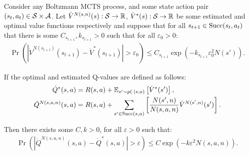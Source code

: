     \begin{lemma} \label{lem:stochastic_step}
        Consider any Boltzmann MCTS process, and some state action pair $(s_t,a_t)\in\mathcal{S}\times\mathcal{A}$. Let $\dot{V}^{N(s,n)}(s):\mathcal{S}\rightarrow \mathbb{R}$, $\dot{V}^*(s):\mathcal{S}\rightarrow \mathbb{R}$ be some estimated and optimal value functions respectively and suppose that for all $s_{t+1}\in{\textnormal{Succ}(s_t,a_t)}$ that there is some $C_{s_{t+1}}, k_{s_{t+1}}>0$ such that for all $\varepsilon_0 >0$:
        \begin{align}
            \Pr\left(\left| \dot{V}^{N(s_{t+1})}(s_{t+1}) - \dot{V}^*(s_{t+1}) \right| > \varepsilon_0 \right) \leq C_{s_{t+1}}\exp(-k_{s_{t+1}}\varepsilon_0^2 N(s')).
        \end{align}
        
        If the optimal and estimated Q-values are defined as follows: 
        \begin{align}
            \dot{Q}^*(s,a)&=R(s,a)+\mathbb{E}_{s'\sim p(\cdot|s,a)}\left[\dot{V}^*(s')\right], \\
            \dot{Q}^{N(s,a,n)}(s,a)&=R(s,a)+\sum_{s'\in{\textnormal{Succ}(s,a)}} \left[
                \frac{N(s',n)}{N(s,a,n)} \dot{V}^{N(s',n)}(s')\right].
        \end{align}
        
        Then there exists some $C,k>0$, for all $\varepsilon>0$ such that:
        \begin{align}
            \Pr\left(\left| \dot{Q}^{N(s,a,n)}(s,a) - \dot{Q}^*(s,a) \right| > \varepsilon \right) \leq C\exp(-k\varepsilon^2 N(s,a,n)).
        \end{align}
    \end{lemma}
    
